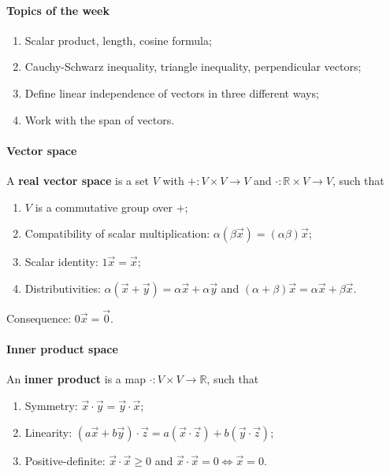 \documentclass{article}
\begin{document}
\paragraph{Topics of the week}

\begin{enumerate}
    \item Scalar product, length, cosine formula;
    \item Cauchy-Schwarz inequality, triangle inequality, perpendicular vectors;
    \item Define linear independence of vectors in three different ways;
    \item Work with the span of vectors.
\end{enumerate}

\paragraph{Vector space} A \textbf{real vector space} is a set $V$ with $+ : V \times V \to V$ and $\cdot : \mathbb R \times V \to V$, such that

\begin{enumerate}
    \item $V$ is a commutative group over $+$;
    \item Compatibility of scalar multiplication: $\alpha (\beta \vec x) = (\alpha \beta) \vec x$;
    \item Scalar identity: $1 \vec x = \vec x$;
    \item Distributivities: $\alpha(\vec x + \vec y) = \alpha \vec x + \alpha \vec y$ and $(\alpha + \beta) \vec x = \alpha \vec x + \beta \vec x$.
\end{enumerate}

Consequence: $0 \vec x = \vec 0$.

\paragraph{Inner product space} An \textbf{inner product} is a map $\cdot : V \times V \to \mathbb R$, such that
\begin{enumerate}
    \item Symmetry: $\vec x \cdot \vec y = \vec y \cdot \vec x$;
    \item Linearity: $(a\vec x + b\vec y) \cdot \vec z = a (\vec x \cdot \vec z) + b (\vec y \cdot \vec z)$;
    \item Positive-definite: $\vec x \cdot \vec x \geq 0$ and $\vec x \cdot \vec x = 0 \iff \vec x = 0$.
\end{enumerate}
\end{document}

